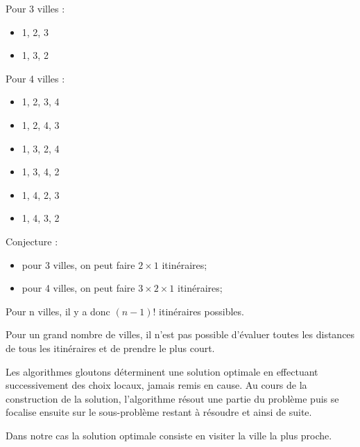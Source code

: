 \ifprof
\begin{corrige}
Pour 3 villes :
\begin{itemize}
\item 1, 2, 3
\item 1, 3, 2
\end{itemize}

Pour 4 villes :
\begin{multicols}{3}
\begin{itemize}
\item 1, 2, 3, 4
\item 1, 2, 4, 3
\item 1, 3, 2, 4
\item 1, 3, 4, 2
\item 1, 4, 2, 3
\item 1, 4, 3, 2
\end{itemize}
\end{multicols}

Conjecture :
\begin{itemize}
\item pour 3 villes, on peut faire $2\times 1$ itinéraires;
\item pour 4 villes, on peut faire $3\times 2\times 1$ itinéraires;
\end{itemize}

Pour n villes, il y a donc $(n-1)!$ itinéraires possibles.
\end{corrige}
\else
\fi


Pour un grand nombre de villes, il n'est pas possible d'évaluer toutes les distances de tous les itinéraires et de prendre le plus court. 

\begin{defi}
Les algorithmes gloutons déterminent une solution optimale en effectuant successivement des choix locaux, jamais remis en cause. Au cours de la construction de la solution, l’algorithme résout une partie du problème puis se focalise ensuite sur le sous-problème restant à résoudre et ainsi de suite.
\end{defi}

Dans notre cas la solution optimale consiste en visiter la ville la plus proche. 
 
